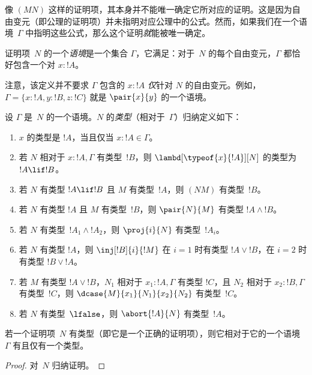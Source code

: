 \documentclass[../../../include/open-logic-section]{subfiles}
\begin{document}


像 $(MN)$ 这样的证明项，其本身并不能唯一确定它所对应的证明。这是因为自由变元（即公理的证明项）并未指明对应公理中的公式。然而，如果我们在一个语境~$\Gamma$ 中指明这些公式，那么这个证明\emph{就}能被唯一确定。

\begin{defn}
证明项~$N$ 的一个\emph{语境}是一个集合 $\Gamma$，它满足：对于~$N$ 的每个自由变元，$\Gamma$ 都恰好包含一个对 $x : !A$。
\end{defn}

注意，该定义并不要求 $\Gamma$ 包含的 $x:!A$ \emph{仅}针对 $N$ 的自由变元。例如，$\Gamma =
\{x:!A, y:!B, z:!C\}$ 就是 $\pair{x}{y}$ 的一个语境。

\begin{defn}
  设 $\Gamma$ 是~$N$ 的一个语境。$N$ 的\emph{类型}（相对于~$\Gamma$）归纳定义如下：
  \begin{enumerate}
  \item $x$ 的类型是 $!A$，当且仅当 $x:!A \in \Gamma$。
  \item 若 $N$ 相对于 $x:!A, \Gamma$ 有类型~$!B$，则 $\lambd[\typeof{x}{!A}][N]$ 的类型为 $!A \lif !B$。
  \item 若 $N$ 有类型 $!A \lif !B$ 且 $M$ 有类型~$!A$，则 $(NM)$ 有类型~$!B$。
  \item 若 $N$ 有类型 $!A$ 且 $M$ 有类型~$!B$，则 $\pair{N}{M}$ 有类型 $!A \land !B$。
  \item 若 $N$ 有类型~$!A_1 \land !A_2$，则 $\proj{i}{N}$ 有类型~$!A_i$。
  \item 若 $N$ 有类型 $!A$，则
    $\inj[!B]{i}{!M}$ 在 $i=1$ 时有类型 $!A \lor !B$，在 $i=2$ 时有类型 $!B \lor !A$。
  \item 若 $M$ 有类型 $!A \lor !B$，$N_1$ 相对于 $x_1:!A, \Gamma$ 有类型 $!C$，且 $N_2$ 相对于 $x_2:!B, \Gamma$ 有类型~$!C$，则 $\dcase{M}{x_1}{N_1}{x_2}{N_2}$ 有类型~$!C$。
  \item 若 $N$ 有类型~$\lfalse$，则 $\abort{!A}{N}$ 有类型~$!A$。
  \end{enumerate}
\end{defn}

\begin{prop}
若一个证明项~$N$ 有类型（即它是一个正确的证明项），则它相对于它的一个语境~$\Gamma$ 有且仅有一个类型。
\end{prop}

\begin{proof}
  对~$N$ 归纳证明。
\end{proof}
\end{document}
